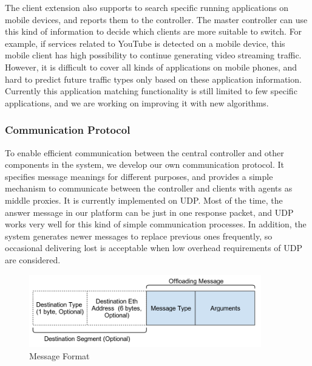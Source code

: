 \documentclass[english]{tktltiki}
\begin{document}
The client extension also supports to search specific running applications on mobile devices, and reports them to the controller. The master controller can use this kind of information to decide which clients are more suitable to switch. For example, if services related to YouTube is detected on a mobile device, this mobile client has high possibility to continue generating video streaming traffic. However, it is difficult to cover all kinds of applications on mobile phones, and hard to predict future traffic types only based on these application information. Currently this application matching functionality is still limited to few specific applications, and we are working on improving it with new algorithms.


\subsubsection{Communication Protocol}

To enable efficient communication between the central controller and other components in the system, we develop our own communication protocol. It specifies message meanings for different purposes, and provides a simple mechanism to communicate between the controller and clients with agents as middle proxies. It is currently implemented on UDP. Most of the time, the answer message in our platform can be just in one response packet, and UDP works very well for this kind of simple communication processes. In addition, the system generates newer messages to replace previous ones frequently, so occasional delivering lost is acceptable when low overhead requirements of UDP are considered.

\begin{figure}[htbp]
  \centering
  \includegraphics[width=0.9\textwidth]{images/format.png}
  \caption{Message Format}
  \label{fig:format}
\end{figure}
\end{document}
